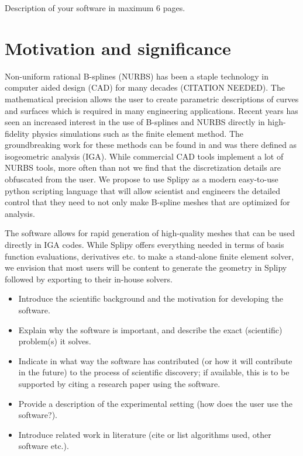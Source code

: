 \documentclass[preprint,12pt, a4paper]{elsarticle}
\begin{document}
\linenumbers


Description of your software in maximum 6 pages.

\section{Motivation and significance}
\label{}

Non-uniform rational B-splines (NURBS) has been a staple technology in computer aided design (CAD) for many decades (CITATION NEEDED).
The mathematical precision allows the user to create parametric descriptions of curves and surfaces which is required in many engineering applications.
Recent years has seen an increased interest in the use of B-splines and NURBS directly in high-fidelity physics simulations such as the finite element method.
The groundbreaking work for these methods can be found in \cite{hughes2005iac} and was there defined as isogeometric analysis (IGA).
While commercial CAD tools implement a lot of NURBS tools, more often than not we find that the discretization details are obfuscated from the user.
We propose to use Splipy as a modern easy-to-use python scripting language that will allow scientist and engineers the detailed control that they need to not only make B-spline meshes that are optimized for analysis.

The software allows for rapid generation of high-quality meshes that can be used directly in IGA codes.
While Splipy offers everything needed in terms of basis function evaluations, derivatives etc. to make a stand-alone finite element solver, we envision that most users will be content to generate the geometry in Splipy followed by exporting to their in-house solvers.

\begin{itemize}
  \item Introduce the scientific background and the motivation for developing the software.
  \item Explain why the software is important, and describe the exact (scientific) problem(s) it solves.
  \item Indicate in what way the software has contributed (or how it will contribute in the future) to the process of scientific discovery; if available, this is to be supported by citing a research paper using the software.
  \item Provide a description of the experimental setting (how does the user use the software?).
  \item Introduce related work in literature (cite or list algorithms used, other software etc.).
\end{itemize}
\end{document}
